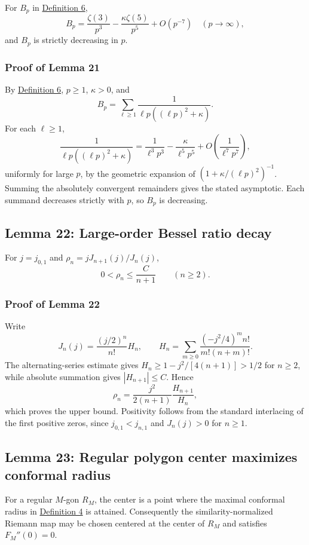 \documentclass[11pt]{article}
\begin{document}
For \(B_p\) in \hyperref[def-positive-kernel]{Definition 6}, \[
B_p=\frac{\zeta(3)}{p^3}-\frac{\kappa\zeta(5)}{p^5}+O(p^{-7})
\quad (p\to\infty),
\] and \(B_p\) is strictly decreasing in \(p\).

\subsubsection{Proof of Lemma 21}\label{proof-lem-bp-asymptotic}

By \hyperref[def-positive-kernel]{Definition 6}, \(p\ge1\),
\(\kappa>0\), and \[
B_p=\sum_{\ell\ge1}\frac1{\ell p((\ell p)^2+\kappa)}.
\] For each \(\ell\ge1\), \[
\frac1{\ell p((\ell p)^2+\kappa)}
=\frac1{\ell^3p^3}-\frac{\kappa}{\ell^5p^5}+O\left(\frac{1}{\ell^7p^7}\right),
\] uniformly for large \(p\), by the geometric expansion of
\((1+\kappa/(\ell p)^2)^{-1}\). Summing the absolutely convergent
remainders gives the stated asymptotic. Each summand decreases strictly
with \(p\), so \(B_p\) is decreasing.

\subsection{Lemma 22: Large-order Bessel ratio
decay}\label{lem-bessel-ratio-decay}

For \(j=j_{0,1}\) and \(\rho_n=jJ_{n+1}(j)/J_n(j)\), \[
0<\rho_n\le\frac{C}{n+1}\qquad(n\ge2).
\]

\subsubsection{Proof of Lemma 22}\label{proof-lem-bessel-ratio-decay}

Write \[
J_n(j)=\frac{(j/2)^n}{n!}H_n,
\qquad
H_n=\sum_{m\ge0}\frac{(-j^2/4)^m n!}{m!(n+m)!}.
\] The alternating-series estimate gives \(H_n\ge1-j^2/[4(n+1)]>1/2\)
for \(n\ge2\), while absolute summation gives \(|H_{n+1}|\le C\). Hence
\[
\rho_n=\frac{j^2}{2(n+1)}\frac{H_{n+1}}{H_n},
\] which proves the upper bound. Positivity follows from the standard
interlacing of the first positive zeros, since \(j_{0,1}<j_{n,1}\) and
\(J_n(j)>0\) for \(n\ge1\).

\subsection{Lemma 23: Regular polygon center maximizes conformal
radius}\label{lem-regular-center-maximizer}

For a regular \(M\)-gon \(R_M\), the center is a point where the maximal
conformal radius in \hyperref[def-conformal-data]{Definition 4} is
attained. Consequently the similarity-normalized Riemann map may be
chosen centered at the center of \(R_M\) and satisfies \(F_M''(0)=0\).
\end{document}
